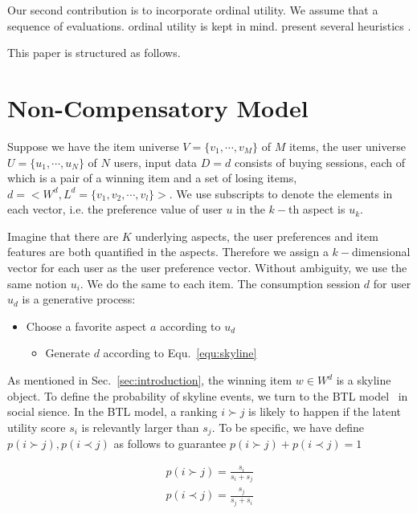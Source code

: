 \documentclass[sigconf]{acmart}
\begin{document}
Our second contribution is to incorporate ordinal utility. We assume that a sequence of evaluations. ordinal utility is kept in mind. present several heuristics .

  
  This paper is structured as follows. 
 



\section{Non-Compensatory Model}\label{sec:model1}

Suppose we have the item universe $V=\{v_1,\cdots,v_M\}$ of $M$ items, the user universe $U=\{u_1,\cdots,u_N\}$ of $N$ users, input data $D={d}$ consists of buying sessions, each of which is a pair of a winning item and a set of losing items, $d=<W^d,L^d=\{v_1,v_2,\cdots,v_l\}>$. We use subscripts to denote the elements in each vector, i.e. the preference value of user $u$ in the $k-$th aspect is $u_k$. 

Imagine that there are $K$ underlying aspects, the user preferences and item features are both quantified in the aspects. Therefore we assign a $k-$dimensional vector for each user as the user preference vector. Without ambiguity, we use the same notion $u_i$. We do the same to each item. The consumption session $d$ for user $u_d$ is a generative process:


\begin{itemize}
	\item Choose a favorite aspect $a$ according to $u_d$
	
	\begin{itemize}
		\item Generate $d$ according to Equ.~\ref{equ:skyline}  
	\end{itemize}
\end{itemize}
  
As mentioned in Sec.~\ref{sec:introduction}, the winning item $w\in W^d$ is a skyline object. To define the probability of skyline events, we turn to the BTL model~\cite{Hunter2004MM} in social sience. In the BTL model, a ranking $i \succ j$ is likely to happen if the latent utility score $s_i$ is relevantly larger than $s_j$. To be specific, we have define $p(i \succ j), p(i \prec j)$ as follows to guarantee $p(i \succ j)+ p(i \prec j) =1$


\begin{align*}
	p(i \succ j)=\frac{s_i}{s_i+ s_j} \\
	p(i \prec j)=\frac{s_j}{s_j+ s_i} \\
\end{align*}
  
\end{document}
